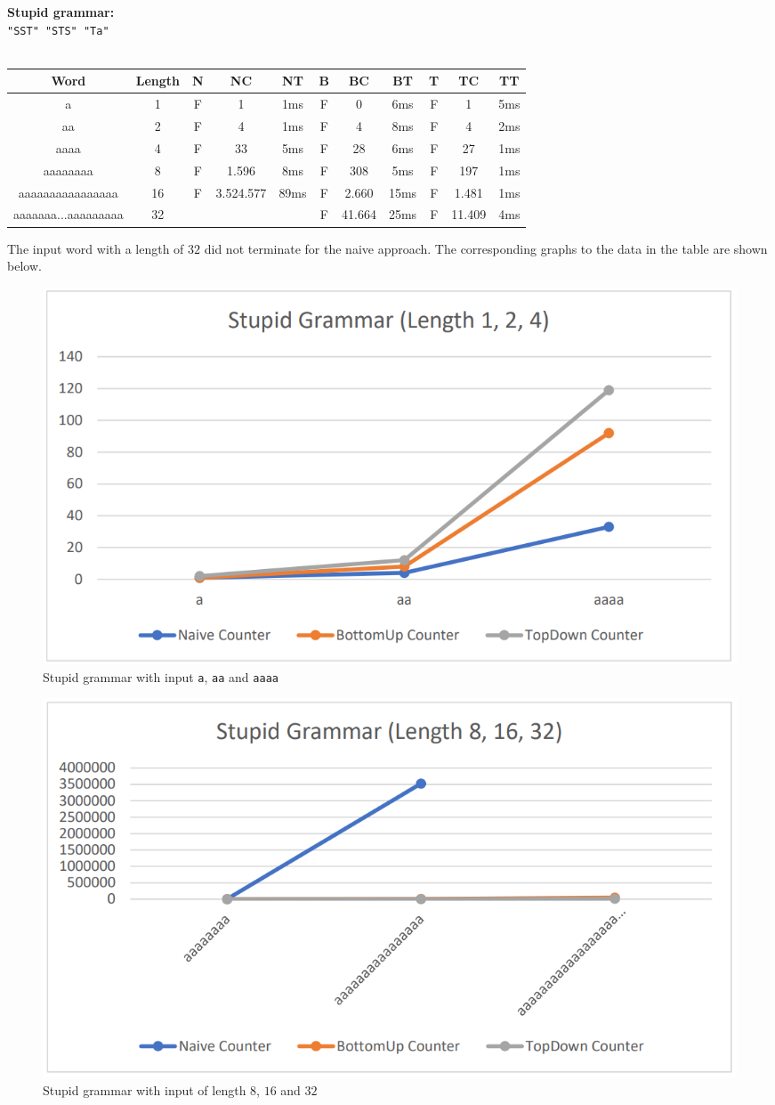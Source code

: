 \documentclass[a4paper, 11pt]{article}
\begin{document}
\textbf{Stupid grammar:} \\
\texttt{"SST" "STS" "Ta"}
\ \\ \\
\begin{tabular}{|c|c||c|c|c||c|c|c||c|c|c|}
\hline
Word & Length & N & NC & NT & B & BC & BT & T & TC & TT \\
\hline
\hline
a & 1 & F & 1 & 1ms & F & 0 & 6ms & F & 1 & 5ms \\
\hline
aa & 2 & F & 4 & 1ms & F & 4 & 8ms & F & 4 & 2ms \\
\hline
aaaa & 4 & F & 33 & 5ms & F & 28 & 6ms & F &27 & 1ms \\
\hline
aaaaaaaa & 8 & F & 1.596 & 8ms & F & 308 & 5ms & F & 197 & 1ms \\
\hline
aaaaaaaaaaaaaaaa & 16 & F & 3.524.577 & 89ms & F & 2.660 & 15ms & F & 1.481 & 1ms \\
\hline
aaaaaaa...aaaaaaaaa & 32 &  & & & F & 41.664 & 25ms & F & 11.409 & 4ms \\
\hline
\end{tabular}

The input word with a length of $32$ did not terminate for the naive approach. The corresponding graphs to the data in the table are shown below.


\begin{figure}[H]
\includegraphics[scale=0.5]{diagrams/SG_1.png}
\caption{Stupid grammar with input \texttt{a}, \texttt{aa} and \texttt{aaaa}}
\end{figure}

\begin{figure}[H]
\includegraphics[scale=0.5]{diagrams/SG_2.png}
\caption{Stupid grammar with input of length $8$, $16$ and $32$}
\end{figure}
\end{document}
